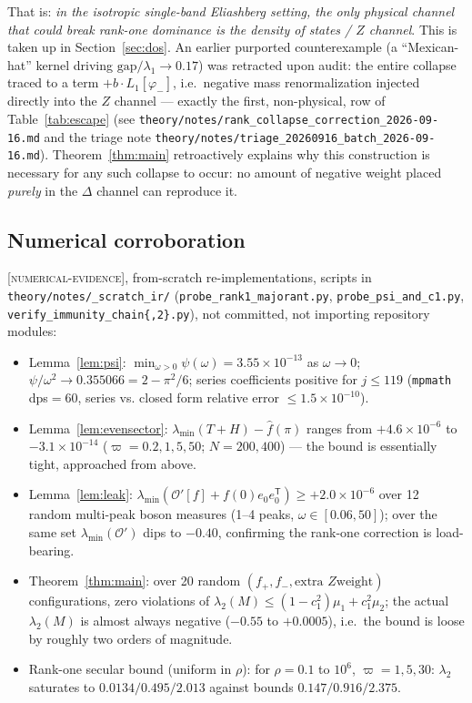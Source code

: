 \documentclass[11pt]{article}
\newcommand{\OO}{\mathcal{O}}
\begin{document}
That is: \emph{in the isotropic single-band Eliashberg setting, the only
physical channel that could break rank-one dominance is the density of
states / $Z$ channel}. This is taken up in Section~\ref{sec:dos}. An earlier
purported counterexample (a ``Mexican-hat'' kernel driving
$\mathrm{gap}/\lambda_1\to0.17$) was retracted upon audit: the entire collapse
traced to a term $+b\cdot L_1[\varphi_-]$, i.e.\ negative mass
renormalization injected directly into the $Z$ channel --- exactly the first,
non-physical, row of Table~\ref{tab:escape}
(see \texttt{theory/notes/rank\_collapse\_correction\_2026-09-16.md} and the
triage note \texttt{theory/notes/triage\_20260916\_batch\_2026-09-16.md}).
Theorem~\ref{thm:main} retroactively explains why this construction is
necessary for any such collapse to occur: no amount of negative weight placed
\emph{purely} in the $\Delta$ channel can reproduce it.

\subsection{Numerical corroboration}

\textsc{[numerical-evidence]}, from-scratch re-implementations, scripts in
\texttt{theory/notes/\_scratch\_ir/} (\texttt{probe\_rank1\_majorant.py},
\texttt{probe\_psi\_and\_c1.py}, \texttt{verify\_immunity\_chain\{,2\}.py}),
not committed, not importing repository modules:

\begin{itemize}[nosep]
\item Lemma~\ref{lem:psi}: $\min_{\omega>0}\psi(\omega)=3.55\times10^{-13}$ as
$\omega\to0$; $\psi/\omega^2\to0.355066=2-\pi^2/6$; series coefficients
positive for $j\le119$ (\texttt{mpmath} dps$=60$, series vs. closed form
relative error $\le1.5\times10^{-10}$).
\item Lemma~\ref{lem:evensector}: $\lambda_{\min}(T+H)-\hat f(\pi)$ ranges
from $+4.6\times10^{-6}$ to $-3.1\times10^{-14}$ ($\varpi=0.2,1,5,50$;
$N=200,400$) --- the bound is essentially tight, approached from above.
\item Lemma~\ref{lem:leak}: $\lambda_{\min}(\OO'[f]+f(0)e_0e_0^{\mathsf T})\ge
+2.0\times10^{-6}$ over 12 random multi-peak boson measures (1--4 peaks,
$\omega\in[0.06,50]$); over the same set $\lambda_{\min}(\OO')$ dips to
$-0.40$, confirming the rank-one correction is load-bearing.
\item Theorem~\ref{thm:main}: over 20 random $(f_+,f_-,\text{extra }Z\text{
weight})$ configurations, zero violations of $\lambda_2(M)\le(1-c_1^2)\mu_1+c_1^2\mu_2$;
the actual $\lambda_2(M)$ is almost always negative ($-0.55$ to $+0.0005$),
i.e.\ the bound is loose by roughly two orders of magnitude.
\item Rank-one secular bound (uniform in $\rho$): for $\rho=0.1$ to $10^6$,
$\varpi=1,5,30$: $\lambda_2$ saturates to $0.0134/0.495/2.013$ against bounds
$0.147/0.916/2.375$.
\end{itemize}
\end{document}
